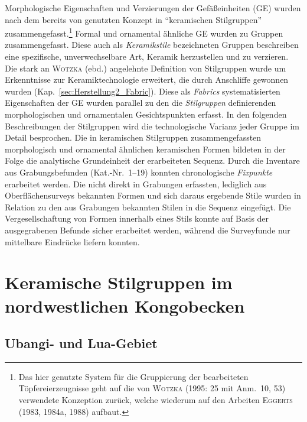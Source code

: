 \begin{multicols}{2}
Morphologische Eigenschaften und Verzierungen der Gefäßeinheiten (GE) wurden nach dem bereits von \textcite[52--57]{Wotzka.1995} genutzten Konzept in \enquote{keramischen Stilgruppen} zusammengefasst.\footnote{Das hier genutzte System für die Gruppierung der bearbeiteten Töpfereierzeugnisse geht auf die von \textsc{Wotzka} (1995: 25 mit Anm.~10, 53) verwendete Konzeption zurück, welche wiederum auf den Arbeiten \textsc{Eggerts} (1983, 1984a, 1988) aufbaut.} Formal und ornamental ähnliche GE wurden zu Gruppen zusammengefasst. Diese auch als \textit{Keramikstile} bezeichneten Gruppen beschreiben eine spezifische, unverwechselbare Art, Keramik herzustellen und zu verzieren. Die stark an \textsc{Wotzka} (ebd.) angelehnte Definition von Stilgruppen wurde um Erkenntnisse zur Keramiktechnologie erweitert, die durch Anschliffe gewonnen wurden (Kap.~\ref{sec:Herstellung2_Fabric}). Diese als \textit{Fabrics} systematisierten Eigenschaften der GE wurden parallel zu den die \textit{Stilgruppen} definierenden morphologischen und ornamentalen Gesichtspunkten erfasst. In den folgenden Beschreibungen der Stilgruppen wird die technologische Varianz jeder Gruppe im Detail besprochen. Die in keramischen Stilgruppen zusammengefassten morphologisch und ornamental ähnlichen keramischen Formen bildeten in der Folge die analytische Grundeinheit der erarbeiteten Sequenz. Durch die Inventare aus Grabungsbefunden (Kat.-Nr.~1--19) konnten chronologische \textit{Fixpunkte} erarbeitet werden. Die nicht direkt in Grabungen erfassten, lediglich aus Oberflächensurveys bekannten Formen und sich daraus ergebende Stile wurden in Relation zu den aus Grabungen bekannten Stilen in die Sequenz eingefügt. Die Vergesellschaftung von Formen innerhalb eines Stils konnte auf Basis der ausgegrabenen Befunde sicher erarbeitet werden, während die Surveyfunde nur mittelbare Eindrücke liefern konnten.

\section{Keramische Stilgruppen im nordwestlichen Kongobecken}\label{sec:StilGr_nwCongo}

\subsection{\mbox{Ubangi}- und Lua-Gebiet}








\end{multicols}

